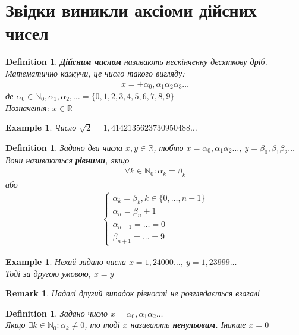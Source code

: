 \documentclass[a4paper, 14pt]{article}
\theoremstyle{theoremdd}
\theoremstyle{theoremdd}
\newtheorem{definition}[theorem]{Definition}
\theoremstyle{theoremdd}
\theoremstyle{theoremdd}
\newtheorem{example}[theorem]{Example}
\theoremstyle{theoremdd}
\theoremstyle{theoremdd}
\newtheorem{remark}[theorem]{Remark}
\theoremstyle{theoremdd}
\theoremstyle{theoremdd}
\begin{document}
\iffalse
\setcounter{section}{0}
\section*{Звідки виникли аксіоми дійсних чисел}
\begin{definition}
\textbf{Дійсним числом} називають нескінченну десяткову дріб.\\
Математично кажучи, це число такого вигляду:
\begin{align*}
x = \pm \alpha_0,\alpha_1 \alpha_2 \alpha_3 \dots
\end{align*}
де $\alpha_0 \in \mathbb{N}_0, \alpha_1,\alpha_2,\dots = \{0,1,2,3,4,5,6,7,8,9\}$\\
Позначення: $x \in \mathbb{R}$
\end{definition}

\begin{example}
Число $\sqrt{2} = 1,4142135623730950488\dots$
\end{example}

\begin{definition}
Задано два числа $x,y \in \mathbb{R}$, тобто $x = \alpha_0,\alpha_1\alpha_2\dots$, $y = \beta_0,\beta_1\beta_2\dots$\\
Вони називаються \textbf{рівними}, якщо
\begin{align*}
\forall k \in \mathbb{N}_0: \alpha_k = \beta_k
\end{align*}
або
\begin{align*}
\begin{cases}
\alpha_k = \beta_k, k \in \{0,\dots,n-1\} \\
\alpha_n = \beta_n + 1 \\
\alpha_{n+1} = \dots = 0 \\
\beta_{n+1} = \dots = 9
\end{cases}
\end{align*}
\end{definition}

\begin{example}
Нехай задано числа $x = 1,24000\dots$, $y = 1,23999\dots$\\
Тоді за другою умовою, $x=y$
\end{example}

\begin{remark}
Надалі другий випадок рівності не розглядається взагалі
\end{remark}

\begin{definition}
Задано число $x = \alpha_0,\alpha_1\alpha_2\dots$\\
Якщо $\exists k \in \mathbb{N}_0: \alpha_k \neq 0$, то тоді $x$ називають \textbf{ненульовим}. Інакше $x = 0$
\end{definition}
\end{document}
